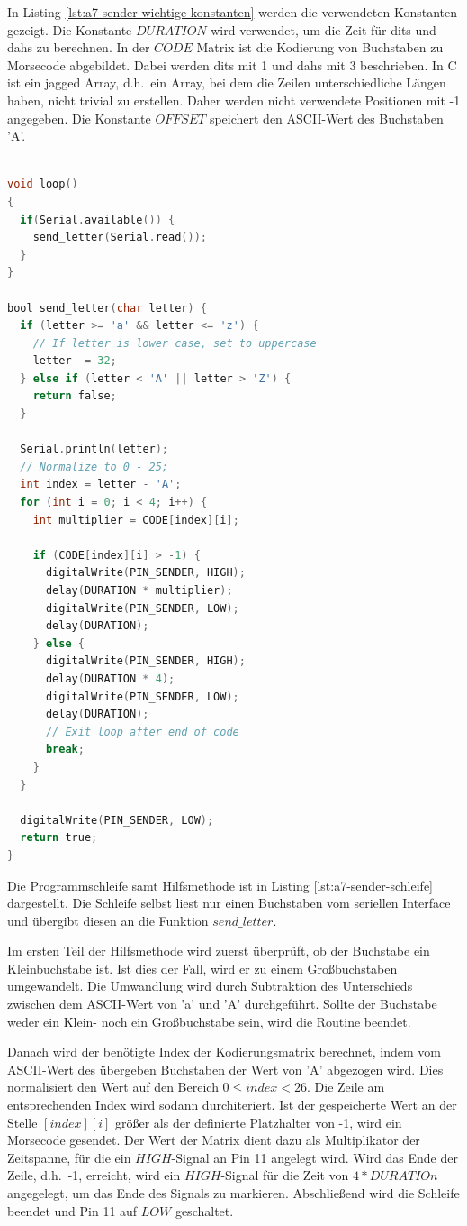 In Listing \ref{lst:a7-sender-wichtige-konstanten} werden die verwendeten Konstanten gezeigt.
Die Konstante $DURATION$ wird verwendet, um die Zeit für dits und dahs zu berechnen.
In der $CODE$ Matrix ist die Kodierung von Buchstaben zu Morsecode abgebildet.
Dabei werden dits mit 1 und dahs mit 3 beschrieben.
In C ist ein jagged Array, d.h.\ ein Array, bei dem die Zeilen unterschiedliche Längen haben, nicht trivial zu erstellen.
Daher werden nicht verwendete Positionen mit -1 angegeben.
Die Konstante $OFFSET$ speichert den ASCII-Wert des Buchstaben 'A'.

\begin{lstlisting}[language=C,label={lst:a7-sender-schleife}, caption={Programmschleife des Senders}]

void loop()
{
  if(Serial.available()) {
    send_letter(Serial.read());
  }
}

bool send_letter(char letter) {
  if (letter >= 'a' && letter <= 'z') {
    // If letter is lower case, set to uppercase
    letter -= 32;
  } else if (letter < 'A' || letter > 'Z') {
    return false;
  }

  Serial.println(letter);
  // Normalize to 0 - 25;
  int index = letter - 'A';
  for (int i = 0; i < 4; i++) {
    int multiplier = CODE[index][i];

    if (CODE[index][i] > -1) {
      digitalWrite(PIN_SENDER, HIGH);
      delay(DURATION * multiplier);
      digitalWrite(PIN_SENDER, LOW);
      delay(DURATION);
    } else {
      digitalWrite(PIN_SENDER, HIGH);
      delay(DURATION * 4);
      digitalWrite(PIN_SENDER, LOW);
      delay(DURATION);
      // Exit loop after end of code
      break;
    }
  }

  digitalWrite(PIN_SENDER, LOW);
  return true;
}
\end{lstlisting}

Die Programmschleife samt Hilfsmethode ist in Listing \ref{lst:a7-sender-schleife} dargestellt.
Die Schleife selbst liest nur einen Buchstaben vom seriellen Interface und übergibt diesen an die Funktion $send\_letter$.

Im ersten Teil der Hilfsmethode wird zuerst überprüft, ob der Buchstabe ein Kleinbuchstabe ist.
Ist dies der Fall, wird er zu einem Großbuchstaben umgewandelt.
Die Umwandlung wird durch Subtraktion des Unterschieds zwischen dem ASCII-Wert von 'a' und 'A' durchgeführt.
Sollte der Buchstabe weder ein Klein- noch ein Großbuchstabe sein, wird die Routine beendet.

Danach wird der benötigte Index der Kodierungsmatrix berechnet, indem vom ASCII-Wert des übergeben Buchstaben der Wert von 'A' abgezogen wird.
Dies normalisiert den Wert auf den Bereich $0 \leq index < 26$.
Die Zeile am entsprechenden Index wird sodann durchiteriert.
Ist der gespeicherte Wert an der Stelle $[index][i]$ größer als der definierte Platzhalter von -1, wird ein Morsecode gesendet.
Der Wert der Matrix dient dazu als Multiplikator der Zeitspanne, für die ein $HIGH$-Signal an Pin 11 angelegt wird.
Wird das Ende der Zeile, d.h.\ -1, erreicht, wird ein $HIGH$-Signal für die Zeit von $4*DURATIOn$ angegelegt, um das Ende des Signals zu markieren.
Abschließend wird die Schleife beendet und Pin 11 auf $LOW$ geschaltet.

